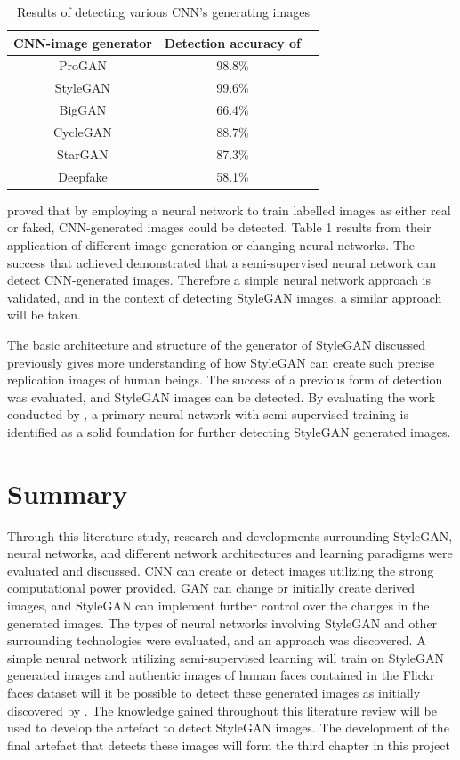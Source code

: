 \begin{table}[!htbp!]%
\caption{Results of \cite{Wang} detecting various CNN's generating images}
\label{tabl:1}
\centering
\small
\begin{tabular}{ccc}
\hline
CNN-image generator & Detection accuracy of \citep{Wang}\\ 
\hline
ProGAN & 98.8\% \\
StyleGAN & 99.6\% \\
BigGAN & 66.4\%\\
CycleGAN & 88.7\%\\
StarGAN & 87.3\%\\
Deepfake & 58.1\%\\
\hline
\end{tabular}
\end{table}

\cite{Wang} proved that by employing a neural network to train labelled images as either real or faked, CNN-generated images could be detected. Table 1 results from their application of different image generation or changing neural networks. The success that \cite{Wang} achieved demonstrated that a semi-supervised neural network can detect CNN-generated images. Therefore a simple neural network approach is validated, and in the context of detecting StyleGAN images, a similar approach will be taken.

The basic architecture and structure of the generator of StyleGAN discussed previously gives more understanding of how StyleGAN can create such precise replication images of human beings. The success of a previous form of detection was evaluated, and StyleGAN images can be detected. By evaluating the work conducted by \cite{Wang}, a primary neural network with semi-supervised training is identified as a solid foundation for further detecting StyleGAN generated images.

\section{Summary}

Through this literature study, research and developments surrounding StyleGAN, neural networks, and different network architectures and learning paradigms were evaluated and discussed. CNN can create or detect images utilizing the strong computational power provided. GAN can change or initially create derived images, and StyleGAN can implement further control over the changes in the generated images. The types of neural networks involving StyleGAN and other surrounding technologies were evaluated, and an approach was discovered. A simple neural network utilizing semi-supervised learning will train on StyleGAN generated images and authentic images of human faces contained in the Flickr faces dataset will it be possible to detect these generated images as initially discovered by \citep{Wang}. The knowledge gained throughout this literature review will be used to develop the artefact to detect StyleGAN images. The development of the final artefact that detects these images will form the third chapter in this project